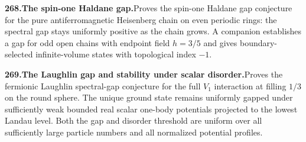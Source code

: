 \documentclass[11pt,a4paper]{article}
\begin{document}
  \par \begin{minipage}{\linewidth}
  \fontsize{10.5}{12.6}\selectfont\RaggedRight
  \hypertarget{result 268}{}
  {\bfseries\textcolor{muted}{268.}\enspace The spin-one Haldane gap.}\enspace Proves the spin-one Haldane gap conjecture for the pure antiferromagnetic Heisenberg chain on even periodic rings: the spectral gap stays uniformly positive as the chain grows. A companion establishes a gap for odd open chains with endpoint field $h=3/5$ and gives boundary-selected infinite-volume states with topological index $-1$.\par
  \end{minipage}\par\vspace{5pt}



  \par \begin{minipage}{\linewidth}
  \fontsize{10.5}{12.6}\selectfont\RaggedRight
  \hypertarget{result 269}{}
  {\bfseries\textcolor{muted}{269.}\enspace The Laughlin gap and stability under scalar disorder.}\enspace Proves the fermionic Laughlin spectral-gap conjecture for the full $V_1$ interaction at filling $1/3$ on the round sphere. The unique ground state remains uniformly gapped under sufficiently weak bounded real scalar one-body potentials projected to the lowest Landau level. Both the gap and disorder threshold are uniform over all sufficiently large particle numbers and all normalized potential profiles.\par
  \end{minipage}\par\vspace{5pt}
\end{document}

